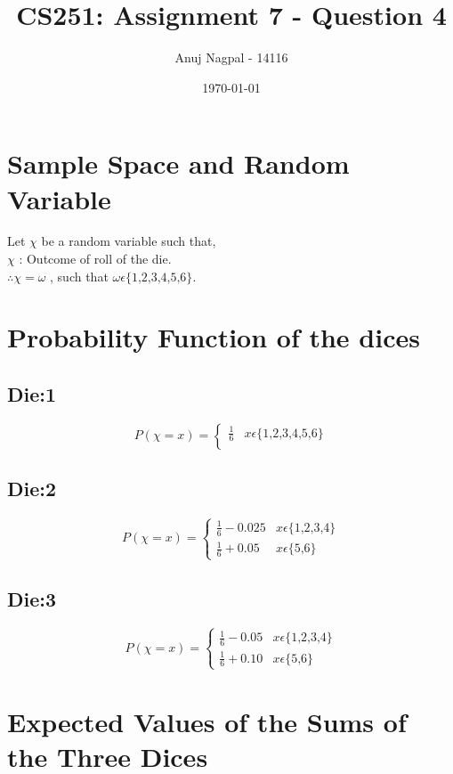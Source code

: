 \documentclass[a4paper, 12pt]{article}
\title{CS251: Assignment 7 - Question 4}
\author{Anuj Nagpal - 14116}
\date{\today}
\begin{document}
\maketitle
\tableofcontents
\newpage
\listoffigures
\newpage

\section{Sample Space and Random Variable}
Let $\chi$ be a random variable such that,\\
$\chi$ : Outcome of roll of the die.\\
$\therefore \chi = \omega$ , such that $\omega \epsilon \text{\{1,2,3,4,5,6\}}$. 

\section{Probability Function of the dices}
\subsection{Die:1}
\[
P(\chi = x)= 
\begin{cases} 
      \frac{1}{6} & x\epsilon\text{\{1,2,3,4,5,6\}} \\
   \end{cases}
\]

\subsection{Die:2}
\[
P(\chi = x)= 
\begin{cases} 
      \frac{1}{6}-0.025 & x\epsilon\text{\{1,2,3,4\}} \\
      \frac{1}{6}+0.05 & x\epsilon\text{\{5,6\}}
   \end{cases}
\]

\subsection{Die:3}
\[
P(\chi = x)= 
\begin{cases} 
      \frac{1}{6}-0.05 & x\epsilon\text{\{1,2,3,4\}} \\
      \frac{1}{6}+0.10 & x\epsilon\text{\{5,6\}}
   \end{cases}
\]

\section{Expected Values of the Sums of the Three Dices}
\end{document}
